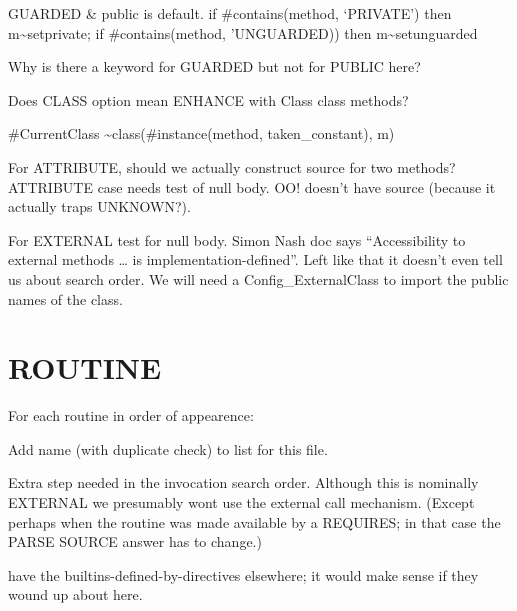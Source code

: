 GUARDED \& public is default. if \#contains(method, `PRIVATE') then
m\textasciitilde setprivate; if \#contains(method, 'UNGUARDED)) then
m\textasciitilde setunguarded

Why is there a keyword for GUARDED but not for PUBLIC here?

Does CLASS option mean ENHANCE with Class class methods?

\#CurrentClass \textasciitilde class(\#instance(method,
taken\_constant), m)

For ATTRIBUTE, should we actually construct source for two methods?
ATTRIBUTE case needs test of null body. OO! doesn't have source (because
it actually traps UNKNOWN?).

For EXTERNAL test for null body. Simon Nash doc says ``Accessibility to
external methods \ldots{} is implementation-defined''. Left like that it
doesn't even tell us about search order. We will need a
Config\_ExternalClass to import the public names of the class.

\hypertarget{routine}{%
\section{ROUTINE}\label{routine}}

For each routine in order of appearence:

Add name (with duplicate check) to list for this file.

Extra step needed in the invocation search order. Although this is
nominally EXTERNAL we presumably wont use the external call mechanism.
(Except perhaps when the routine was made available by a REQUIRES; in
that case the PARSE SOURCE answer has to change.)

have the builtins-defined-by-directives elsewhere; it would make sense
if they wound up about here.
